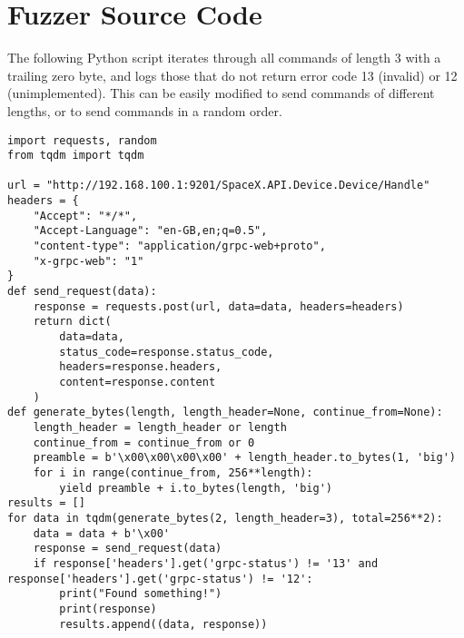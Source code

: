 \section{Fuzzer Source Code}\label{app:fuzzer}

The following Python script iterates through all commands of length 3 with a trailing zero byte, and logs those that do not return error code 13 (invalid) or 12 (unimplemented). This can be easily modified to send commands of different lengths, or to send commands in a random order.

\begin{lstlisting}
import requests, random
from tqdm import tqdm

url = "http://192.168.100.1:9201/SpaceX.API.Device.Device/Handle"
headers = {
    "Accept": "*/*",
    "Accept-Language": "en-GB,en;q=0.5",
    "content-type": "application/grpc-web+proto",
    "x-grpc-web": "1"
}
def send_request(data):
    response = requests.post(url, data=data, headers=headers)
    return dict(
        data=data,
        status_code=response.status_code,
        headers=response.headers,
        content=response.content
    )
def generate_bytes(length, length_header=None, continue_from=None):
    length_header = length_header or length
    continue_from = continue_from or 0
    preamble = b'\x00\x00\x00\x00' + length_header.to_bytes(1, 'big')
    for i in range(continue_from, 256**length):
        yield preamble + i.to_bytes(length, 'big')
results = []
for data in tqdm(generate_bytes(2, length_header=3), total=256**2):
    data = data + b'\x00'
    response = send_request(data)
    if response['headers'].get('grpc-status') != '13' and response['headers'].get('grpc-status') != '12':
        print("Found something!")
        print(response)
        results.append((data, response))
\end{lstlisting}